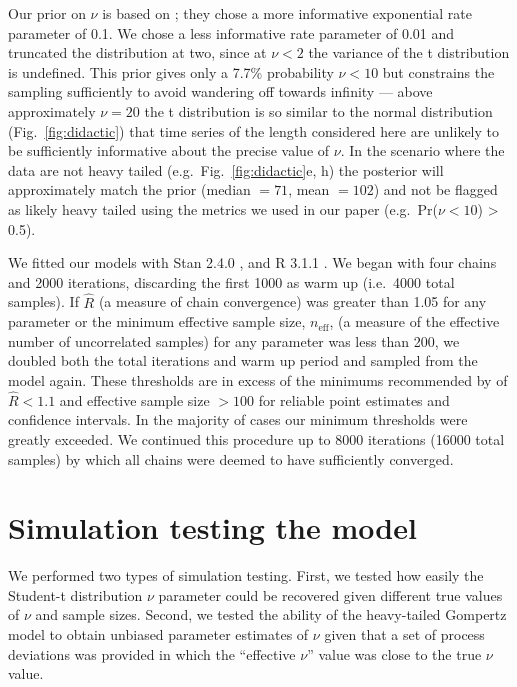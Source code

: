 Our prior on $\nu$ is based on \citet{fernandez1998}; they chose a more informative exponential rate parameter of 0.1. We chose a less informative rate parameter of 0.01 and truncated the distribution at two, since at $\nu < 2$ the variance of the t distribution is undefined. This prior gives only a 7.7\% probability $\nu < 10$ but constrains the sampling sufficiently to avoid wandering off towards infinity --- above approximately $\nu = 20$ the t distribution is so similar to the normal distribution (Fig.~\ref{fig:didactic}) that time series of the length considered here are unlikely to be sufficiently informative about the precise value of $\nu$. In the scenario where the data are not heavy tailed (e.g.~Fig.~\ref{fig:didactic}e, h) the posterior will approximately match the prior (median $= 71$, mean $= 102$) and not be flagged as likely heavy tailed using the metrics we used in our paper (e.g.~Pr($\nu < 10$) \textgreater{} 0.5).

We fitted our models with Stan 2.4.0 \citep{stan-manual2014}, and R 3.1.1 \citep{r2014}. We began with four chains and 2000 iterations, discarding the first 1000 as warm up (i.e.~4000 total samples). If $\hat{R}$ (a measure of chain convergence) was greater than 1.05 for any parameter or the minimum effective sample size, $n_\mathrm{eff}$, (a measure of the effective number of uncorrelated samples) for any parameter was less than 200, we doubled both the total iterations and warm up period and sampled from the model again. These thresholds are in excess of the minimums recommended by \citet{gelman2006a} of $\hat{R} < 1.1$ and effective sample size $> 100$ for reliable point estimates and confidence intervals. In the majority of cases our minimum thresholds were greatly exceeded. We continued this procedure up to 8000 iterations (16000 total samples) by which all chains were deemed to have sufficiently converged.

\section{Simulation testing the model}

We performed two types of simulation testing. First, we tested how easily the Student-t distribution $\nu$ parameter could be recovered given different true values of $\nu$ and sample sizes. Second, we tested the ability of the heavy-tailed Gompertz model to obtain unbiased parameter estimates of $\nu$ given that a set of process deviations was provided in which the ``effective $\nu$'' value was close to the true $\nu$ value. 

